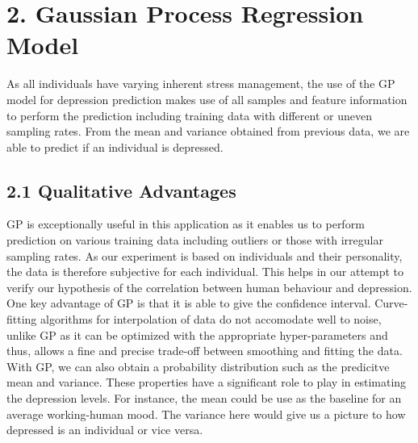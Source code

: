 \documentclass{article}
\begin{document}
	\section{2. Gaussian Process Regression Model}
	As all individuals have varying inherent stress management, the use of the GP model for depression prediction makes use of all samples and feature information to perform the prediction including training data with different or uneven sampling rates. From the mean and variance obtained from previous data, we are able to predict if an individual is depressed. \\	

	\subsection{2.1 Qualitative Advantages}
	 GP is exceptionally useful in this application as it enables us to perform prediction on various training data including outliers or those with irregular sampling rates. As our experiment is based on individuals and their personality, the data is therefore subjective for each individual. This helps in our attempt to verify our hypothesis of the correlation between human behaviour and depression. \\

One key advantage of GP is that it is able to give the confidence interval. Curve-fitting algorithms for interpolation of data do not accomodate well to noise, unlike GP as it can be optimized with the appropriate hyper-parameters and thus, allows a fine and precise trade-off between smoothing and fitting the data. \\

With GP, we can also obtain a probability distribution such as the predicitve mean and variance. These properties have a significant role to play in estimating the depression levels. For instance, the mean could be use as the baseline for an average working-human mood. The variance here would give us a picture to how depressed is an individual or vice versa.
\end{document}

